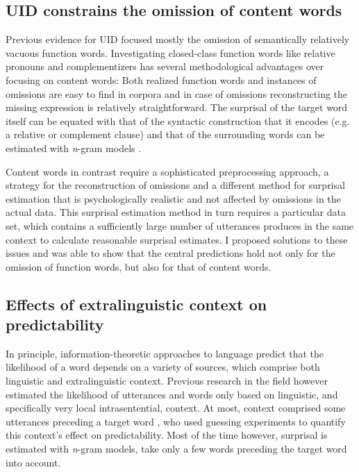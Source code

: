 \subsection{UID constrains the omission of content words}
Previous evidence for UID focused mostly the omission of semantically relatively vacuous function words. Investigating closed-class function words like relative pronouns \citep{levy.jaeger2007} and complementizers \citep{jaeger2010} has several methodological advantages over focusing on content words: Both realized function words and instances of omissions are easy to find in corpora and in case of omissions reconstructing the missing expression is relatively straightforward. The surprisal of the target word itself can be equated with that of the syntactic construction that it encodes (e.g. a relative or complement clause) and that of the surrounding words can be estimated with \textit{n}-gram models \citep{levy.jaeger2007}. 

Content words in contrast require a sophisticated preprocessing approach, a strategy for the reconstruction of omissions and a different method for surprisal estimation that is psychologically realistic and not affected by omissions in the actual data. This surprisal estimation method in turn requires a particular data set, which contains a sufficiently large number of utterances produces in the same context to calculate reasonable surprisal estimates. I proposed solutions to these issues and was able to show that the central predictions hold not only for the omission of function words, but also for that of content words.

\subsection{Effects of extralinguistic context on predictability}
In principle, information-theoretic approaches to language predict that the likelihood of a word depends on a variety of sources, which comprise both linguistic and extralinguistic context. Previous research in the field however estimated the likelihood of utterances and words only based on linguistic, and specifically very local intrasentential, context. At most, context comprised some utterances preceding a target word \citep[see e.g.][]{tily.piantadosi2009, kravtchenko2014}, who used guessing experiments \citep{shannon1951} to quantify this context's effect on predictability. Most of the time however, surprisal is estimated with \textit{n}-gram models, take only a few words preceding the target word into account.\largerpage

